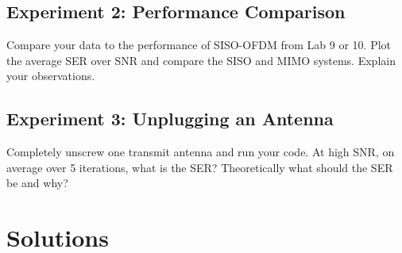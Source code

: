 \documentclass{book}
\begin{document}
\subsection{Experiment 2: Performance Comparison}
Compare your data to the performance of SISO-OFDM from Lab 9 or 10. Plot the average SER over SNR and compare the SISO and MIMO systems. Explain your observations.

\subsection{Experiment 3: Unplugging an Antenna}
Completely unscrew one transmit antenna and run your code. At high SNR, on average over 5 iterations, what is the SER? Theoretically what should the SER be and why?


\section{Solutions}
\end{document}
